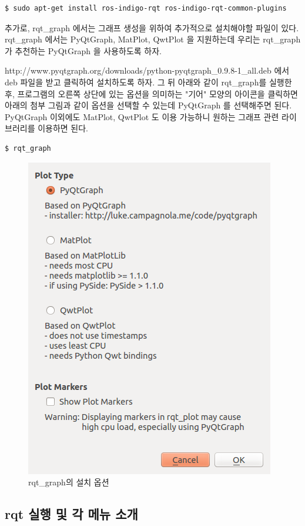 \vspace{\baselineskip}
\begin{lstlisting}[language=ROS]
$ sudo apt-get install ros-indigo-rqt ros-indigo-rqt-common-plugins
\end{lstlisting}

추가로, rqt\_graph 에서는 그래프 생성을 위하여 추가적으로 설치해야할 파일이 있다. rqt\_graph 에서는 PyQtGraph, MatPlot, QwtPlot 을 지원하는데 우리는 rqt\_graph 가 추천하는 PyQtGraph 을 사용하도록 하자.

http://www.pyqtgraph.org/downloads/python-pyqtgraph\_0.9.8-1\_all.deb 에서 deb 파일을 받고 클릭하여 설치하도록 하자. 그 뒤 아래와 같이 rqt\_graph를 실행한 후, 프로그램의 오른쪽 상단에 있는 옵션을 의미하는 "기어" 모양의 아이콘을 클릭하면 아래의 첨부 그림과 같이 옵션을 선택할 수 있는데 PyQtGraph 를 선택해주면 된다. PyQtGraph 이외에도 MatPlot, QwtPlot 도 이용 가능하니 원하는 그래프 관련 라이브러리를 이용하면 된다.

\vspace{\baselineskip}
\begin{lstlisting}[language=ROS]
$ rqt_graph
\end{lstlisting}

\begin{figure}[h]
\centering\includegraphics[width=0.5\columnwidth]{pictures/chapter6/rqtplotoption.png}
\caption{rqt\_graph의 설치 옵션}
\end{figure}

\newpage
\subsection{rqt 실행 및 각 메뉴 소개}

